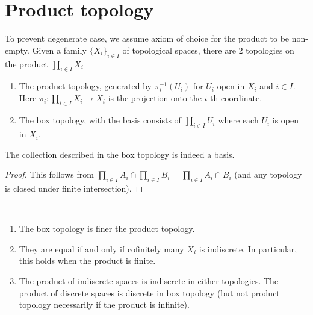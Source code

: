 \documentclass{treatise}
\begin{document}
\newpage

\section{Product topology}
To prevent degenerate case, we assume axiom of choice for the product to be non-empty. Given a family $\{ X_i \}_{i \in I}$ of topological spaces, there are 2 topologies on the product $\prod_{i \in I} X_i$
\begin{enumerate}
    \item The product topology, generated by $\pi_i^{-1} (U_i)$ for $U_i$ open in $X_i$ and $i \in I$. Here $\pi_i : \prod_{i \in I} X_i \to X_i$ is the projection onto the $i$-th coordinate.
    \item The box topology, with the basis consists of $\prod_{i \in I} U_i$ where each $U_i$ is open in $X_i$.
\end{enumerate}
\begin{remark}
The collection described in the box topology is indeed a basis.
\end{remark}
\begin{proof}
This follows from $\prod_{i \in I} A_i \cap \prod_{i \in I} B_i = \prod_{i \in I} A_i \cap B_i$ (and any topology is closed under finite intersection).
\end{proof}
\begin{proposition} \ 
\begin{enumerate}
    \item The box topology is finer the product topology.
    \item They are equal if and only if cofinitely many $X_i$ is indiscrete. In particular, this holds when the product is finite.
    \item The product of indiscrete spaces is indiscrete in either topologies. The product of discrete spaces is discrete in box topology (but not product topology necessarily if the product is infinite).
\end{enumerate}
\end{proposition}
\end{document}
